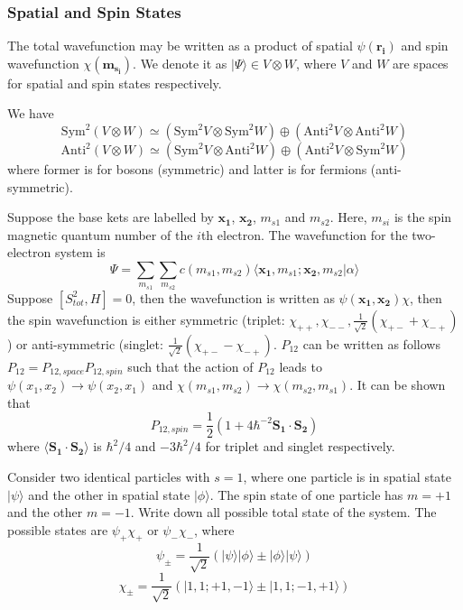 \documentclass[a4paper]{article}
\begin{document}
\subsubsection*{Spatial and Spin States}
\begin{defi}
The total wavefunction may be written as a product of spatial $\psi(\mathbf{r_i})$ and spin wavefunction $\chi(\mathbf{m_{s_i}})$. We denote it as $|\Psi\rangle\in V\otimes W$, where $V$ and $W$ are spaces for spatial and spin states respectively. 
\end{defi}
\begin{thm}
We have
$$\text{Sym}^2(V\otimes W)\simeq(\text{Sym}^2V\otimes\text{Sym}^2W)\oplus(\text{Anti}^2V\otimes\text{Anti}^2W)$$
$$\text{Anti}^2(V\otimes W)\simeq(\text{Sym}^2V\otimes\text{Anti}^2W)\oplus(\text{Anti}^2V\otimes\text{Sym}^2W)$$
where former is for bosons (symmetric) and latter is for fermions (anti-symmetric).
\end{thm}
\begin{eg}
Suppose the base kets are labelled by $\mathbf{x_1}$, $\mathbf{x_2}$, $m_{s1}$ and $m_{s2}$. Here, $m_{si}$ is the spin magnetic quantum number of the $i$th electron. The wavefunction for the two-electron system is
$$\Psi=\sum_{m_{s1}}\sum_{m_{s2}}c(m_{s1},m_{s2})\langle\mathbf{x_1},m_{s1};\mathbf{x_2},m_{s2}|\alpha\rangle$$
Suppose $[S^2_{tot},H]=0$, then the wavefunction is written as $\psi(\mathbf{x_1},\mathbf{x_2})\chi$, then the spin wavefunction is either symmetric (triplet: $\chi_{++},\chi_{--},\frac{1}{\sqrt{2}}(\chi_{+-}+\chi_{-+})$) or anti-symmetric (singlet: $\frac{1}{\sqrt{2}}(\chi_{+-}-\chi_{-+})$. $P_{12}$ can be written as follows $P_{12}=P_{12,space}P_{12,spin}$ such that the action of $P_{12}$ leads to $\psi(x_1,x_2)\rightarrow\psi(x_2,x_1)$ and $\chi(m_{s1},m_{s2})\rightarrow\chi(m_{s2},m_{s1})$. It can be shown that
$$P_{12,spin}=\frac{1}{2}(1+4\hbar^{-2}\mathbf{S_1}\cdot\mathbf{S_2})$$
where $\langle\mathbf{S_1}\cdot\mathbf{S_2}\rangle$ is $\hbar^2/4$ and $-3\hbar^2/4$ for triplet and singlet respectively. 
\end{eg}
\begin{eg}
Consider two identical particles with $s=1$, where one particle is in spatial state $|\psi\rangle$ and the other in spatial state $|\phi\rangle$. The spin state of one particle has $m=+1$ and the other $m=-1$. Write down all possible total state of the system. The possible states are $\psi_+\chi_+$ or $\psi_-\chi_-$, where
$$\psi_\pm=\frac{1}{\sqrt{2}}(|\psi\rangle|\phi\rangle\pm|\phi\rangle|\psi\rangle)$$
$$\chi_\pm=\frac{1}{\sqrt{2}}(|1,1;+1,-1\rangle\pm|1,1;-1,+1\rangle)$$
\end{eg}
\end{document}
